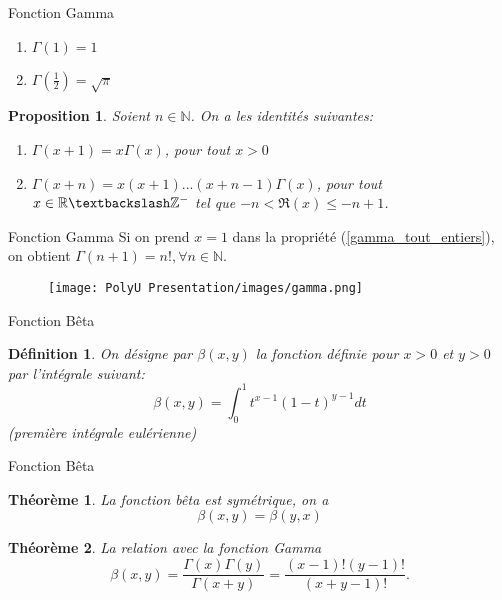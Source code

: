 \documentclass{sintefbeamer}
\newtheorem{pro1}{Proposition}
\newtheorem{def1}{Définition}
\newtheorem{theo1}{Théorème}
\newtheorem{rema1}{Remarque}
\begin{document}
\begin{frame}[fragile]{Fonction Gamma}
\begin{example}
    \begin{enumerate}
        \item $\Gamma(1) = 1$
        \item $\Gamma{(\frac{1}{2})} = \sqrt{\pi}$
    \end{enumerate}
\end{example}
\begin{pro1}
    Soient $n\in \mathbb{N}$. On a les identités suivantes:
        \begin{enumerate}
            \item $\Gamma(x+1) = x\Gamma(x)$, pour tout $x > 0$\label{gamma_n}
            \item $\Gamma(x+n) = x(x+1) ... (x+n-1)\Gamma(x)$, \label{gamma_tout_entiers} pour tout $x\in \mathbb{R \textbackslash Z^-}$ tel que $ -n < \Re(x) \leq -n+1 $.
        \end{enumerate}
\end{pro1}
\end{frame}

\begin{frame}{Fonction Gamma}
    Si on prend $x=1$ dans la propriété (\ref{gamma_tout_entiers}), on obtient $ \Gamma(n+1)=n!, \forall n \in \mathbb{N}.$
\vspace{-0.2cm}
\begin{figure}[H]
    \centering
    \texttt{[image: PolyU Presentation/images/gamma.png]}
\end{figure}
\end{frame}


\begin{frame}{Fonction Bêta}
    \begin{def1}
On désigne par $\beta(x,y)$ la fonction définie pour $x>0$ et $y>0$
par l’intégrale suivant:
    \begin{equation}
        \beta(x,y) = \int_{0}^{1} t^{x-1}(1-t)^{y-1} dt
    \end{equation}
    (première intégrale eulérienne)
\end{def1}
\end{frame}


\begin{frame}{Fonction Bêta}
    \begin{theo1}
    La fonction bêta est symétrique, on a
    \begin{equation}
        \beta(x,y)=\beta(y,x)
    \end{equation}
\end{theo1}
\begin{theo1}
    La relation avec la fonction Gamma\\
    \begin{equation}
        \beta(x,y) = \frac{\Gamma(x)\Gamma(y)}{\Gamma(x+y)} = \frac{(x-1)!(y-1)!}{(x+y-1)!}.
    \end{equation}
\end{theo1}
\end{frame}
\end{document}
